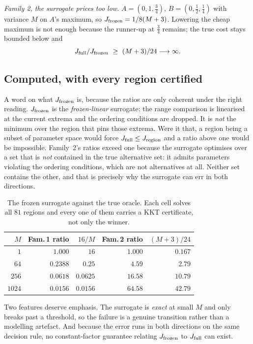\emph{Family 2, the surrogate prices too low.} $A=(0,1,\tfrac34)$, $B=(0,\tfrac12,\tfrac14)$
with variance $M$ on $A$'s maximum, so $J_{\rm frozen}=1/8(M+3)$. Lowering the cheap maximum
is not enough because the runner-up at $\tfrac34$ remains; the true cost stays bounded below
and
\begin{equation}
J_{\rm full}/J_{\rm frozen}\ \ge\ (M+3)/24\longrightarrow\infty .
\label{eq:fam2}
\end{equation}

\subsection{Computed, with every region certified}

A word on what $J_{\rm frozen}$ is, because the ratios are only coherent under the right
reading. $J_{\rm frozen}$ is the \emph{frozen-linear} surrogate: the range comparison is
linearised at the current extrema and the ordering conditions are dropped. It is \emph{not}
the minimum over the region that pins those extrema. Were it that, a region being a subset
of parameter space would force $J_{\rm full}\le J_{\rm region}$ and a ratio above one would
be impossible. Family~2's ratios exceed one because the surrogate optimises over a set that
is \emph{not} contained in the true alternative set: it admits parameters violating the
ordering conditions, which are not alternatives at all. Neither set contains the other, and
that is precisely why the surrogate can err in both directions.

\begin{table}[t]
\caption{The frozen surrogate against the true oracle. Each cell solves all $81$ regions and
every one of them carries a KKT certificate, not only the winner. \NUM{}}
\label{tab:proxy}
\centering
\footnotesize
\begin{tabular}{@{}rrrrr@{}}
\toprule
$M$ & Fam.\,1 ratio & $16/M$ & Fam.\,2 ratio & $(M{+}3)/24$ \\
\midrule
$1$ & $1.000$ & $16$ & $1.000$ & $0.167$ \\
$64$ & $0.2388$ & $0.25$ & $4.59$ & $2.79$ \\
$256$ & $0.0618$ & $0.0625$ & $16.58$ & $10.79$ \\
$1024$ & $0.0156$ & $0.0156$ & $64.58$ & $42.79$ \\
\bottomrule
\end{tabular}
\end{table}

Two features deserve emphasis. The surrogate is \emph{exact} at small $M$ and only breaks
past a threshold, so the failure is a genuine transition rather than a modelling artefact.
And because the error runs in both directions on the same decision rule, no constant-factor
guarantee relating $J_{\rm frozen}$ to $J_{\rm full}$ can exist.


